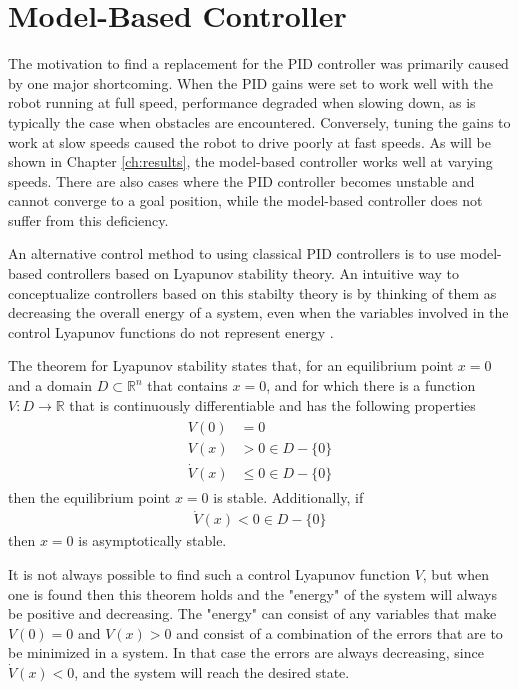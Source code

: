 \section{Model-Based Controller}
\label{sec:lyapunov}
The motivation to find a replacement for the PID controller was primarily caused by one major shortcoming. When the PID gains were set to work well with the robot running at full speed, performance degraded when slowing down, as is typically the case when obstacles are encountered. Conversely, tuning the gains to work at slow speeds caused the robot to drive poorly at fast speeds. As will be shown in Chapter \ref{ch:results}, the model-based controller works well at varying speeds. There are also cases where the PID controller becomes unstable and cannot converge to a goal position, while the model-based controller does not suffer from this deficiency.

An alternative control method to using classical PID controllers is to use model-based controllers based on Lyapunov stability theory. An intuitive way to conceptualize controllers based on this stabilty theory is by thinking of them as decreasing the overall energy of a system, even when the variables involved in the control Lyapunov functions do not represent energy \cite{Khalil02}.

The theorem for Lyapunov stability states that, for an equilibrium point $x=0$ and a domain $D\subset\mathbb{R}^n$ that contains $x=0$, and for which there is a function $V:D\to\mathbb{R}$ that is continuously differentiable and has the following properties 
\begin{align}
\label{eq:lyapunovTheorem}
\begin{split}
V(0) &= 0 \\
V(x) &> 0 \in D-\{0\} \\
\dot{V}(x) &\leq 0 \in D-\{0\}
\end{split}
\end{align}
then the equilibrium point $x=0$ is stable. Additionally, if
\begin{align}
\label{eq:lyapunovAsymptoticStability}
\dot{V}(x) < 0 \in D - \{0\}
\end{align}
then $x=0$ is asymptotically stable.

It is not always possible to find such a control Lyapunov function $V$, but when one is found then this theorem holds and the "energy" of the system will always be positive and decreasing. The "energy" can consist of any variables that make $V(0) = 0$ and $V(x) > 0$ and consist of a combination of the errors that are to be minimized in a system. In that case the errors are always decreasing, since $\dot{V}(x) < 0$, and the system will reach the desired state.

